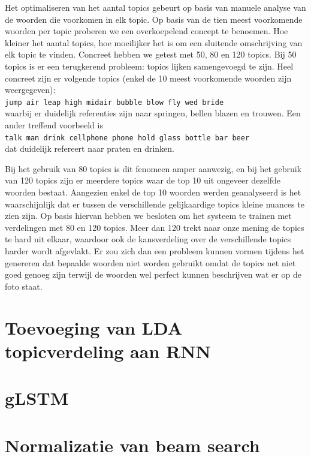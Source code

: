 Het optimaliseren van het aantal topics gebeurt op basis van manuele analyse van de woorden die voorkomen in elk topic. Op basis van de tien meest voorkomende woorden per topic proberen we een overkoepelend concept te benoemen. Hoe kleiner het aantal topics, hoe moeilijker het is om een sluitende omschrijving van elk topic te vinden. Concreet hebben we getest met 50, 80 en 120 topics. Bij 50 topics is er een terugkerend probleem: topics lijken samengevoegd te zijn. Heel concreet zijn er volgende topics (enkel de 10 meest voorkomende woorden zijn weergegeven): \\
\texttt{jump air leap high midair bubble blow fly wed bride}
\\
waarbij er duidelijk referenties zijn naar springen, bellen blazen en trouwen. Een ander treffend voorbeeld is \\
\texttt{talk man drink cellphone phone hold glass bottle bar beer}
\\ dat duidelijk refereert naar praten en drinken.

Bij het gebruik van 80 topics is dit fenomeen amper aanwezig, en bij het gebruik van 120 topics zijn er meerdere topics waar de top 10 uit ongeveer dezelfde woorden bestaat. Aangezien enkel de top 10 woorden werden geanalyseerd is het waarschijnlijk dat er tussen de verschillende gelijkaardige topics kleine nuances te zien zijn. Op basis hiervan hebben we besloten om het systeem te trainen met verdelingen met 80 en 120 topics. Meer dan 120 trekt naar onze mening de topics te hard uit elkaar, waardoor ook de kansverdeling over de verschillende topics harder wordt afgevlakt. Er zou zich dan een probleem kunnen vormen tijdens het genereren dat bepaalde woorden niet worden gebruikt omdat de topics net niet goed genoeg zijn terwijl de woorden wel perfect kunnen beschrijven wat er op de foto staat.


\section{Toevoeging van LDA topicverdeling aan RNN}

\section{gLSTM}



\section{Normalizatie van beam search}

